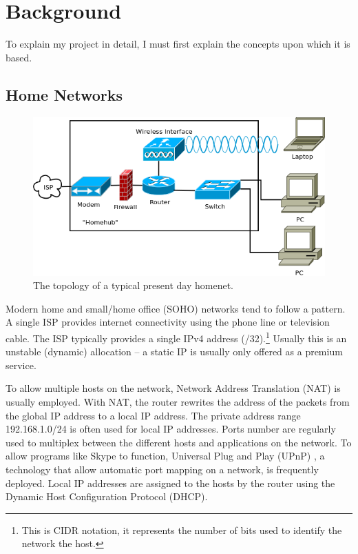 \documentclass[12pt,a4paper,twoside]{report}
\begin{document}
\chapter{Background}
To explain my project in detail, I must first explain the concepts upon which
it is based.

\section{Home Networks}

\begin{figure}
\begin{center}
  \includegraphics[width=\linewidth]{../Diagrams/Network/TypicalHomenet.png}
	\caption{The topology of a typical present day homenet.}\label{fig:typical_homenet}
\end{center}
\end{figure}

Modern home and small/home office (SOHO)  networks tend to follow a pattern. A single ISP provides internet
connectivity using the phone line or television cable.  The ISP typically
provides a single IPv4 address (/32).\footnote{This is CIDR notation, it
represents the number of bits used to identify the network the host.} Usually
this is an unstable (dynamic) allocation -- a static IP is usually only offered
as a premium service. 

To allow multiple hosts on the network, Network Address Translation (NAT)
 is usually employed. With NAT,
the router rewrites the address of the packets from the global IP address to a
local IP address. The private address range 192.168.1.0/24 is often used for
local IP addresses. Ports number are regularly used to multiplex between the
different hosts and applications on the network. To allow programs like Skype
to function, Universal Plug and Play (UPnP) , a technology that allow automatic port mapping on a network, is
frequently deployed. Local IP addresses are assigned to the hosts by the router
using the Dynamic Host Configuration Protocol (DHCP). 
\end{document}
